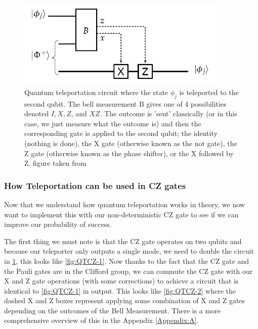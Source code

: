 \begin{figure}[h]
    \centering
    \includegraphics[width=0.9\textwidth]{images/QT circuit.png}
    \caption{Quantum teleportation circuit where the state $\phi_j$ is teleported to the second qubit. The bell measurement B gives one of 4 possibilities denoted $I, X, Z$, and $XZ$. The outcome is 'sent' classically (or in this case, we just measure what the outcome is) and then the corresponding gate is applied to the second qubit; the identity (nothing is done), the X gate (otherwise known as the not gate), the Z gate (otherwise known as the phase shifter), or the X followed by Z. figure taken from \cite{Kok:2005jip}}\label{fig:QT circuit}
\end{figure}

\subsubsection{How Teleportation can be used in CZ gates}
Now that we understand how quantum teleportation works in theory, we now want to implement this with our non-deterministic CZ gate to see if we can improve our probability of success.

The first thing we must note is that the CZ gate operates on two qubits and because our teleporter only outputs a single mode, we need to double the circuit in \cref{fig:QT circuit}, this looks like \cref{fig:QTCZ-1}. Now thanks to the fact that the CZ gate and the Pauli gates are in the Clifford group, we can commute the CZ gate with our X and Z gate operations \cite{GottesmanDaniel1999QTia}(with some corrections) to achieve a circuit that is identical to \cref{fig:QTCZ-1} in output. This looks like \cref{fig:QTCZ-2} where the dashed X and Z boxes represent applying some combination of X and Z gates depending on the outcomes of the Bell Measurement. There is a more comprehensive overview of this in the Appendix \ref{Appendix:A}. 

